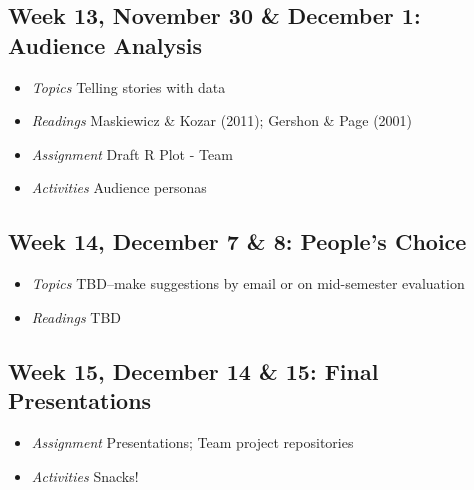 \documentclass[11pt]{article}
\begin{document}
\subsection*{Week 13, November 30 \& December 1: Audience Analysis}
\begin{itemize}
\item \textit{Topics} Telling stories with data %
\item \textit{Readings} Maskiewicz \& Kozar (2011); Gershon \& Page (2001)
\item \textit{Assignment} Draft R Plot - Team
\item \textit{Activities} Audience personas
\end{itemize}

\subsection*{Week 14, December 7 \& 8: People's Choice}
\begin{itemize}
\item \textit{Topics} TBD--make suggestions by email or on mid-semester evaluation
\item \textit{Readings} TBD
\end{itemize}

\subsection*{Week 15, December 14 \& 15: Final Presentations}
\begin{itemize}
\item \textit{Assignment} Presentations; Team project repositories
\item \textit{Activities} Snacks!
\end{itemize}


%
%
%
\clearpage
\end{document}
